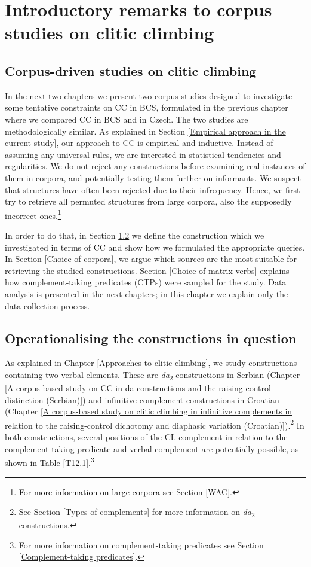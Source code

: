 \chapter{Introductory remarks to corpus studies on clitic climbing}
\label{Introductory remarks to corpus studies on CC}
\section{Corpus-driven studies on clitic climbing}

In the next two chapters we present two corpus studies designed to investigate some tentative constraints on CC in BCS, formulated in the previous chapter where we compared CC in BCS and in Czech. The two studies are methodologically similar. As explained in Section \ref{Empirical approach in the current study}, our approach to CC is empirical and inductive. Instead of assuming any universal rules, we are interested in statistical tendencies and regularities. We do not reject any constructions before examining real instances of them in corpora, and potentially testing them further on informants. We suspect that structures have often been rejected due to their infrequency. Hence, we first try to retrieve all permuted structures from large corpora, also the supposedly incorrect ones.\footnote{\textcolor{black}{For more information on large corpora} see Section \ref{WAC}.}

In order to do that, in Section \ref{Operationalising the constructions in question} we define the construction which we investigated in terms of CC and show how we formulated the appropriate queries. In Section \ref{Choice of corpora}, we argue which sources are the most suitable for retrieving the studied constructions. Section \ref{Choice of matrix verbs} explains how complement-taking predicates (CTPs) were sampled for the study. Data analysis is presented in the next chapters; in this chapter we explain only the data collection process.

\section{Operationalising the constructions in question}
\label{Operationalising the constructions in question}

As explained in Chapter \ref{Approaches to clitic climbing}, we study constructions containing two verbal elements. These are \textit{da}\textsubscript{2}-constructions in Serbian (Chapter \ref{A corpus-based study on CC in da constructions and the raising-control distinction (Serbian)}) and infinitive complement constructions in Croatian (Chapter \ref{A corpus-based study on clitic climbing in infinitive complements in relation to the raising-control dichotomy and diaphasic variation (Croatian)}).\footnote{See Section \ref{Types of complements} for more information on \textit{da}\textsubscript{2}-constructions.} In both constructions, several positions of the CL complement in relation to the complement-taking predicate and verbal complement are potentially possible, as shown in Table \ref{T12.1}.\footnote{For more information on complement-taking predicates see Section \ref{Complement-taking predicates}.}

